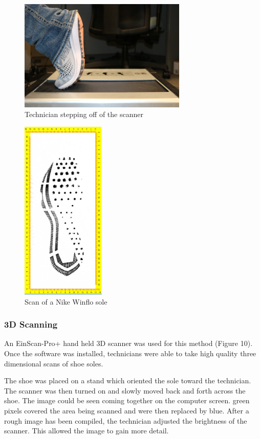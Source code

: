 \begin{figure}[!htp]   
\centering
\includegraphics[width=8cm]{2D_Step_off}
\caption{Technician stepping off of the scanner}
\label{Image 8}
\end{figure}

\begin{figure}[!htp]
\centering
\includegraphics[width=4cm]{2D__Baseline_}
\caption{Scan of a Nike Winflo sole}
\label{Image 9}
\end{figure}


\newpage

\subsubsection{3D Scanning}

An EinScan-Pro+ hand held 3D scanner was used for this method (Figure 10). Once the software was installed,  technicians were able to take high quality three dimensional scans of shoe soles. 
   
   The shoe was placed on a stand which oriented the sole toward the technician. The scanner was then turned on and slowly moved back and forth across the shoe. The image could be seen coming together on the computer screen. green pixels covered the area being scanned and were then replaced by blue. After a rough image has been compiled, the technician adjusted the brightness of the scanner. This allowed the image to gain more detail. 
   
